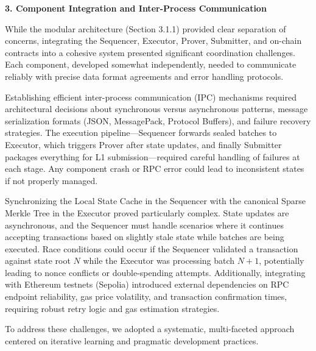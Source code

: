 \textbf{3. Component Integration and Inter-Process Communication}

While the modular architecture (Section 3.1.1) provided clear separation of concerns, integrating the Sequencer, Executor, Prover, Submitter, and on-chain contracts into a cohesive system presented significant coordination challenges. Each component, developed somewhat independently, needed to communicate reliably with precise data format agreements and error handling protocols.

Establishing efficient inter-process communication (IPC) mechanisms required architectural decisions about synchronous versus asynchronous patterns, message serialization formats (JSON, MessagePack, Protocol Buffers), and failure recovery strategies. The execution pipeline—Sequencer forwards sealed batches to Executor, which triggers Prover after state updates, and finally Submitter packages everything for L1 submission—required careful handling of failures at each stage. Any component crash or RPC error could lead to inconsistent states if not properly managed.

Synchronizing the Local State Cache in the Sequencer with the canonical Sparse Merkle Tree in the Executor proved particularly complex. State updates are asynchronous, and the Sequencer must handle scenarios where it continues accepting transactions based on slightly stale state while batches are being executed. Race conditions could occur if the Sequencer validated a transaction against state root $N$ while the Executor was processing batch $N+1$, potentially leading to nonce conflicts or double-spending attempts. Additionally, integrating with Ethereum testnets (Sepolia) introduced external dependencies on RPC endpoint reliability, gas price volatility, and transaction confirmation times, requiring robust retry logic and gas estimation strategies.

To address these challenges, we adopted a systematic, multi-faceted approach centered on iterative learning and pragmatic development practices.
